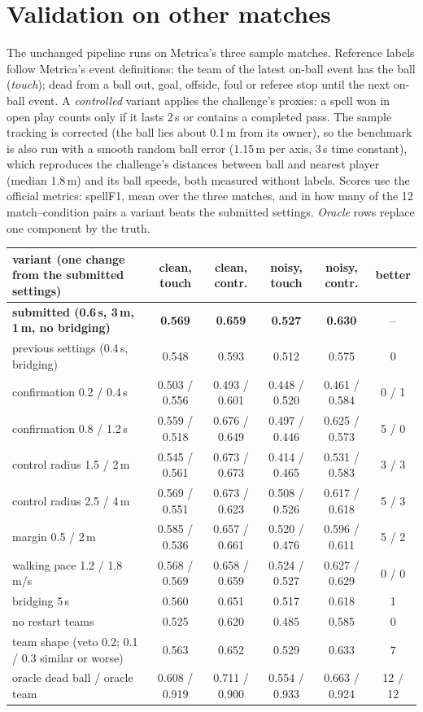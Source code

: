 \documentclass[10pt,a4paper]{article}
\begin{document}
\section{Validation on other matches}
The unchanged pipeline runs on Metrica's three sample matches. Reference labels follow Metrica's event definitions: the team of
the latest on-ball event has the ball (\emph{touch}); dead from a ball out, goal, offside, foul or referee stop until the next
on-ball event. A \emph{controlled} variant applies the challenge's proxies: a spell won in open play counts only if it lasts 2\,s
or contains a completed pass. The sample tracking is corrected (the ball lies about 0.1\,m from its owner), so the benchmark is
also run with a smooth random ball error (1.15\,m per axis, 3\,s time constant), which reproduces the challenge's distances
between ball and nearest player (median 1.8\,m) and its ball speeds, both measured without labels. Scores use the official
metrics: spellF1, mean over the three matches, and in how many of the 12 match--condition pairs a variant beats the submitted
settings. \emph{Oracle} rows replace one component by the truth.
\begin{center}\small\vspace{-4pt}
\begin{tabular}{@{}lccccc@{}}
\toprule
variant (one change from the submitted settings) & clean, touch & clean, contr. & noisy, touch & noisy, contr. & better \\
\midrule
\textbf{submitted (0.6\,s, 3\,m, 1\,m, no bridging)} & \textbf{0.569} & \textbf{0.659} & \textbf{0.527} & \textbf{0.630} & -- \\
previous settings (0.4\,s, bridging) & 0.548 & 0.593 & 0.512 & 0.575 & 0 \\
confirmation 0.2 / 0.4\,s & 0.503 / 0.556 & 0.493 / 0.601 & 0.448 / 0.520 & 0.461 / 0.584 & 0 / 1 \\
confirmation 0.8 / 1.2\,s & 0.559 / 0.518 & 0.676 / 0.649 & 0.497 / 0.446 & 0.625 / 0.573 & 5 / 0 \\
control radius 1.5 / 2\,m & 0.545 / 0.561 & 0.673 / 0.673 & 0.414 / 0.465 & 0.531 / 0.583 & 3 / 3 \\
control radius 2.5 / 4\,m & 0.569 / 0.551 & 0.673 / 0.623 & 0.508 / 0.526 & 0.617 / 0.618 & 5 / 3 \\
margin 0.5 / 2\,m & 0.585 / 0.536 & 0.657 / 0.661 & 0.520 / 0.476 & 0.596 / 0.611 & 5 / 2 \\
walking pace 1.2 / 1.8\,m/s & 0.568 / 0.569 & 0.658 / 0.659 & 0.524 / 0.527 & 0.627 / 0.629 & 0 / 0 \\
bridging 5\,s & 0.560 & 0.651 & 0.517 & 0.618 & 1 \\
no restart teams & 0.525 & 0.620 & 0.485 & 0.585 & 0 \\
team shape (veto 0.2; 0.1 / 0.3 similar or worse) & 0.563 & 0.652 & 0.529 & 0.633 & 7 \\
\midrule
oracle dead ball / oracle team & 0.608 / 0.919 & 0.711 / 0.900 & 0.554 / 0.933 & 0.663 / 0.924 & 12 / 12 \\
\bottomrule
\end{tabular}\vspace{-4pt}
\end{center}
\end{document}
